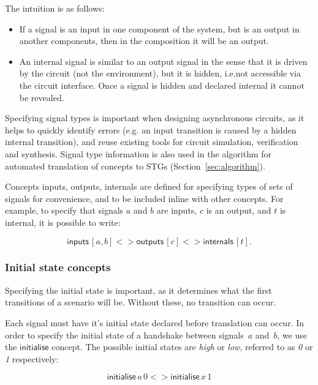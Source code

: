 \documentclass[british,conference,compsoc]{IEEEtran}
\begin{document}
The intuition is as follows:
\begin{itemize}
    \item If a signal is an input in one component of the system, but is an
    output in another components, then in the composition it will be an output.
    \item An internal signal is similar to an output signal in the sense
that it is driven by the circuit (not the environment), but it is hidden, 
i.e.not accessible via the circuit interface. Once a signal is hidden and 
declared internal it cannot be revealed.
\end{itemize}

\noindent Specifying signal types is important when designing asynchronous
circuits, as it helps to quickly identify errors (e.g. an input transition is
caused by a hidden internal transition), and reuse existing tools for circuit
simulation, verification and synthesis. Signal type information is also used
in the algorithm for automated translation of concepts to
STGs (Section~\ref{sec:algorithm}).

Concepts \textsf{inputs}, \textsf{outputs}, \textsf{internals} are defined for
specifying types of sets of signals for convenience, and to be included inline 
with other concepts. For example, to specify that signals $a$ and $b$ are 
inputs, $c$ is an output, and $t$ is internal, it is possible to write:

\[
\mathsf{inputs}\,[a, b] <> \mathsf{outputs}\,[c] <>
\mathsf{internals}\,[t].
\]


\subsubsection{Initial state concepts\label{sub:initState}}

Specifying the initial state is important, as it determines what the first 
transitions of a scenario will be. Without these, no transition can occur.

Each signal must have it's initial state declared before translation can occur. 
In order to specify the initial state of a handshake between signals~$a$
and~$b$, we use the $\mathsf{initialise}$ concept.
The possible initial states are \emph{high} or \emph{low}, referred to as 
\emph{0} or \emph{1} respectively:

\[
\mathsf{initialise}\,a\,0 <> \mathsf{initialise}\,x\, 1
\]
\end{document}
